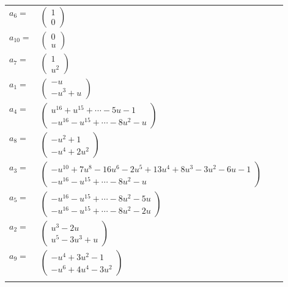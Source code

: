 \documentclass[1p]{elsarticle_modified}
\theoremstyle{definition}
\begin{document}
\begin{tabular}{m{7pt} m{180pt} m{7pt} m{180pt} }
\flushright $a_{6}=$&$\begin{pmatrix}1\\0\end{pmatrix}$ \\
\flushright $a_{10}=$&$\begin{pmatrix}0\\u\end{pmatrix}$ \\
\flushright $a_{7}=$&$\begin{pmatrix}1\\u^2\end{pmatrix}$ \\
\flushright $a_{1}=$&$\begin{pmatrix}- u\\- u^3+u\end{pmatrix}$ \\
\flushright $a_{4}=$&$\begin{pmatrix}u^{16}+u^{15}+\cdots-5 u-1\\- u^{16}- u^{15}+\cdots-8 u^2- u\end{pmatrix}$ \\
\flushright $a_{8}=$&$\begin{pmatrix}- u^2+1\\- u^4+2 u^2\end{pmatrix}$ \\
\flushright $a_{3}=$&$\begin{pmatrix}- u^{10}+7 u^8-16 u^6-2 u^5+13 u^4+8 u^3-3 u^2-6 u-1\\- u^{16}- u^{15}+\cdots-8 u^2- u\end{pmatrix}$ \\
\flushright $a_{5}=$&$\begin{pmatrix}- u^{16}- u^{15}+\cdots-8 u^2-5 u\\- u^{16}- u^{15}+\cdots-8 u^2-2 u\end{pmatrix}$ \\
\flushright $a_{2}=$&$\begin{pmatrix}u^3-2 u\\u^5-3 u^3+u\end{pmatrix}$ \\
\flushright $a_{9}=$&$\begin{pmatrix}- u^4+3 u^2-1\\- u^6+4 u^4-3 u^2\end{pmatrix}$\\&\end{tabular}
\end{document}
